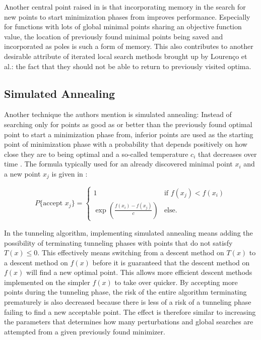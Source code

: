 \documentclass[a4paper,12pt,twoside]{article}
\begin{document}
Another central point raised in \cite{lourenco_iterated_2003} is that incorporating memory in the search for new points to start minimization phases from improves performance. Especially for functions with lots of global minimal points sharing an objective function value, the location of previously found minimal points being saved and incorporated as poles is such a form of memory. This also contributes to another desirable attribute of iterated local search methods brought up by Lourenço et al.: the fact that they should not be able to return to previously visited optima. 

\subsection{Simulated Annealing}
Another technique the authors mention is simulated annealing: Instead of searching only for points as good as or better than the previously found optimal point to start a minimization phase from, inferior points are used as the starting point of minimization phase with a probability that depends positively on how close they are to being optimal and a so-called temperature $c_i$ that decreases over time \cite[\S 5.3.3]{lourenco_iterated_2003}. The formula typically used for an already discovered minimal point $x_i$ and a new point $x_j$ is given in \cite[Def. 5]{delahaye_simulated_2019}:

\begin{equation} \label{eq:annealing_acceptance}
    P\{\text{accept } x_j\} = \begin{cases} 1 & \text{if } f(x_j) < f(x_i) \\ \exp{\left(\frac{f(x_i)-f(x_j)}{c}\right)} & \text{else.} \end{cases}
\end{equation}

In the tunneling algorithm, implementing simulated annealing means adding the possibility of terminating tunneling phases with points that do not satisfy $T(x) \leq 0$. This effectively means switching from a descent method on $T(x)$ to a descent method on $f(x)$ before it is guaranteed that the descent method on $f(x)$ will find a new optimal point. This allows more efficient descent methods implemented on the simpler $f(x)$ to take over quicker. By accepting more points during the tunneling phase, the risk of the entire algorithm terminating prematurely is also decreased because there is less of a risk of a tunneling phase failing to find a new acceptable point. The effect is therefore similar to increasing the parameters that determines how many perturbations and global searches are attempted from a given previously found minimizer.
\end{document}

